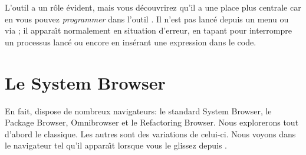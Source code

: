 \documentclass[a4paper,10pt,twoside]{book}
\begin{document}
L'outil  a un r\^ole \'evident, mais vous d\'ecouvrirez qu'il a une place plus centrale 
car en \st vous pouvez \emph{programmer} dans l'outil .  Il n'est pas lanc\'e depuis un menu ou via \toolsflap; il appara\^{\i}t normalement en situation d'erreur,
en tapant  pour interrompre un processus lanc\'e ou
encore en ins\'erant une expression  dans le code.





\section{Le System Browser}
\label{sec:browser} %

En fait, \sq dispose de nombreux navigateurs: le standard System Browser, le Package Browser, Omnibrowser et le Refactoring Browser. 
Nous explorerons tout d'abord le  classique. Les autres sont des variations de celui-ci.
Nous voyons dans  le navigateur tel qu'il appara\^{\i}t lorsque vous le glissez depuis  \toolsflapind.
\end{document}
